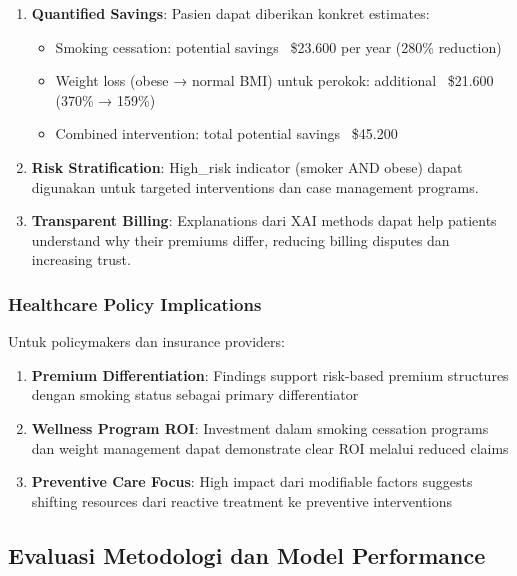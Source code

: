 \begin{enumerate}
    \item \textbf{Quantified Savings}: Pasien dapat diberikan konkret estimates:
    \begin{itemize}
        \item Smoking cessation: potential savings ~\$23.600 per year (280\% reduction)
        \item Weight loss (obese → normal BMI) untuk perokok: additional ~\$21.600 (370\% → 159\%)
        \item Combined intervention: total potential savings ~\$45.200
    \end{itemize}

    \item \textbf{Risk Stratification}: High\_risk indicator (smoker AND obese) dapat digunakan untuk targeted interventions dan case management programs.

    \item \textbf{Transparent Billing}: Explanations dari XAI methods dapat help patients understand why their premiums differ, reducing billing disputes dan increasing trust.
\end{enumerate}

\subsubsection{Healthcare Policy Implications}

Untuk policymakers dan insurance providers:

\begin{enumerate}
    \item \textbf{Premium Differentiation}: Findings support risk-based premium structures dengan smoking status sebagai primary differentiator

    \item \textbf{Wellness Program ROI}: Investment dalam smoking cessation programs dan weight management dapat demonstrate clear ROI melalui reduced claims

    \item \textbf{Preventive Care Focus}: High impact dari modifiable factors suggests shifting resources dari reactive treatment ke preventive interventions
\end{enumerate}

\subsection{Evaluasi Metodologi dan Model Performance}
\label{subsec:evaluasi-metodologi}

